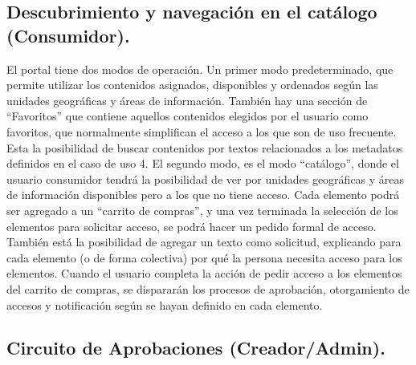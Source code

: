 \subsection{Descubrimiento y navegación en el catálogo (Consumidor).}

El portal tiene dos modos de operación. Un primer modo predeterminado, que permite utilizar los contenidos asignados, disponibles y ordenados según las unidades geográficas y áreas de información.
	También hay una sección de “Favoritos” que contiene aquellos contenidos elegidos por el usuario como favoritos, que normalmente simplifican el acceso a los que son de uso frecuente.
	Esta la posibilidad de buscar contenidos por textos relacionados a los metadatos definidos en el caso de uso 4.
	El segundo modo, es el modo “catálogo”, donde el usuario consumidor tendrá la posibilidad de ver por unidades geográficas y áreas de información disponibles pero a los que no tiene acceso. Cada elemento podrá ser agregado a un “carrito de compras”, y una vez terminada la selección de los elementos para solicitar acceso, se podrá hacer un pedido formal de acceso. También está la posibilidad de agregar un texto como solicitud, explicando para cada elemento (o de forma colectiva) por qué la persona necesita acceso para los elementos. Cuando el usuario completa la acción de pedir acceso a los elementos del carrito de compras, se dispararán los procesos de aprobación, otorgamiento de accesos y notificación según se hayan definido en cada elemento.


\subsection{Circuito de Aprobaciones (Creador/Admin).}

